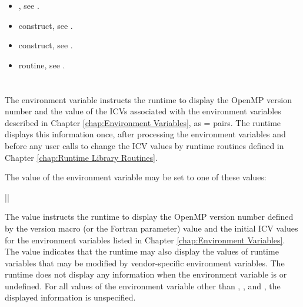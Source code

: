 \crossreferences
\begin{itemize}
\item {}, see .

\item {} construct, see .

\item {} construct, see .

\item {} routine, see .
\end{itemize}









\section{}
\label{sec:OMP_DISPLAY_ENV}
The  environment variable instructs the runtime to display the
OpenMP version number and the value of the ICVs associated with the environment
variables described in Chapter \ref{chap:Environment Variables},
as  =  pairs. The runtime displays this
information once, after processing the environment variables and before any user calls
to change the ICV values by runtime routines defined in Chapter \ref{chap:Runtime Library Routines}.

The value of the  environment variable may be set to one of these
values:

{||}

The  value instructs the runtime to display the OpenMP version number defined by
the  version macro (or the  Fortran parameter) value and
the initial ICV values for the environment variables listed in
Chapter \ref{chap:Environment Variables}. The 
value indicates that the runtime may also display the values
of runtime variables that may be modified by vendor-specific
environment variables. The runtime does not display any information
when the  environment variable is
 or undefined. For all values of the environment
variable other than , , and ,
the displayed information is unspecified.

